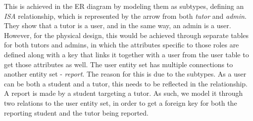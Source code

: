 This is achieved in the ER diagram by modeling them as subtypes, defining an \textit{ISA} relationship, which is represented by the arrow from both \textit{tutor} and \textit{admin}.
They show that a tutor is a user, and in the same way, an admin is a user.
However, for the physical design, this would be achieved through separate tables for both tutors and admins, in which the attributes specific to those roles are defined along with a key that links it together with a user from the user table to get those attributes as well.
The user entity set has multiple connections to another entity set - \textit{report}.
The reason for this is due to the subtypes.
As a user can be both a student and a tutor, this needs to be reflected in the relationship.
A report is made by a student targeting a tutor.
As such, we model it through two relations to the user entity set, in order to get a foreign key for both the reporting student and the tutor being reported.
